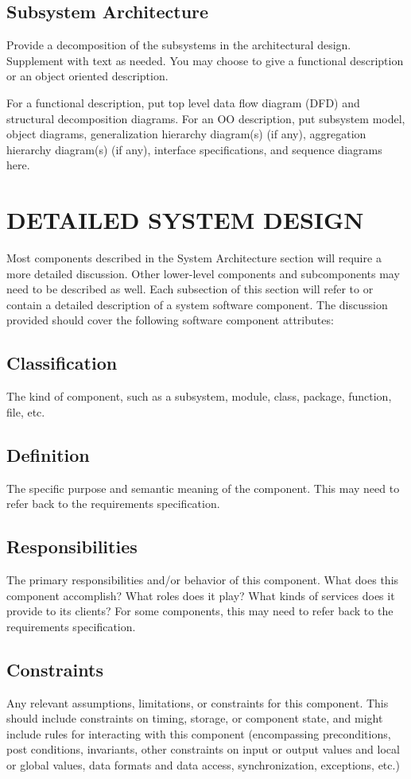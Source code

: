 \documentclass[12pt, a4paper]{report}
\begin{document}
\subsection{Subsystem Architecture}
Provide a decomposition of the subsystems in the architectural design. Supplement with text as needed. You may choose to give a functional description or an object oriented description.

For a functional description, put top level data flow diagram (DFD) and structural decomposition diagrams. For an OO description, put subsystem model, object diagrams, generalization hierarchy diagram(s) (if any), aggregation hierarchy diagram(s) (if any), interface specifications, and sequence diagrams here. 

\section{DETAILED SYSTEM DESIGN}
Most components described in the System Architecture section will require a more detailed discussion. Other lower-level components and subcomponents may need to be described as well. Each subsection of this section will refer to or contain a detailed description of a system software component. The discussion provided should cover the following software component attributes: 
\subsection{Classification}
The kind of component, such as a subsystem, module, class, package, function, file, etc. 
\subsection{Definition}
The specific purpose and semantic meaning of the component. This may need to refer back to the requirements specification. 
\subsection{Responsibilities}
The primary responsibilities and/or behavior of this component. What does this
component accomplish? What roles does it play? What kinds of services does it provide to its clients? For some components, this may need to refer back to the requirements specification. 
\subsection{Constraints}
Any relevant assumptions, limitations, or constraints for this component. This should include constraints on timing, storage, or component state, and might include rules for interacting with this component (encompassing preconditions, post conditions, invariants, other constraints on input or output values and local or global values, data formats and data access, synchronization, exceptions, etc.) 
\end{document}
